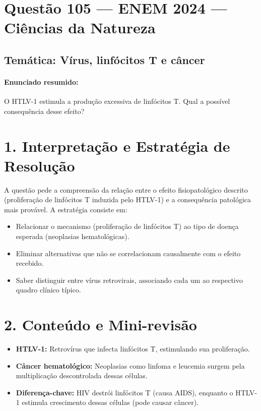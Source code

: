 \documentclass{article}
\begin{document}
\section*{Questão 105 — ENEM 2024 — Ciências da Natureza}

\subsection*{Temática: Vírus, linfócitos T e câncer }

\paragraph{Enunciado resumido:} O HTLV-1 estimula a produção excessiva de linfócitos T. Qual a possível consequência desse efeito?

\section*{1. Interpretação e Estratégia de Resolução}

A questão pede a compreensão da relação entre o efeito fisiopatológico descrito (proliferação de linfócitos T induzida pelo HTLV-1) e a consequência patológica mais provável. A estratégia consiste em:
\begin{itemize}
  \item Relacionar o mecanismo (proliferação de linfócitos T) ao tipo de doença esperada (neoplasias hematológicas).
  \item Eliminar alternativas que não se correlacionam causalmente com o efeito recebido.
  \item Saber distinguir entre vírus retrovirais, associando cada um ao respectivo quadro clínico típico.
\end{itemize}

\section*{2. Conteúdo e Mini-revisão}

\begin{itemize}
  \item \textbf{HTLV-1:} Retrovírus que infecta linfócitos T, estimulando sua proliferação.
  \item \textbf{Câncer hematológico:} Neoplasias como linfoma e leucemia surgem pela multiplicação descontrolada dessas células.
  \item \textbf{Diferença-chave:} HIV destrói linfócitos T (causa AIDS), enquanto o HTLV-1 estimula crescimento dessas células (pode causar câncer).
\end{itemize}
\end{document}
